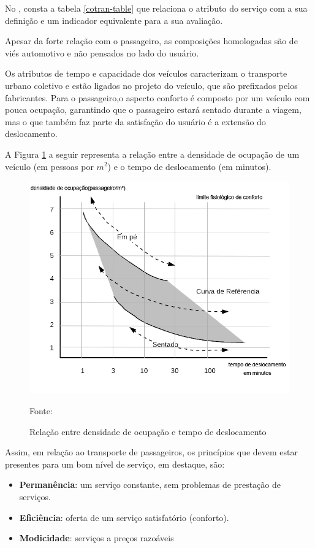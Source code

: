 No , consta a tabela \ref{cotran-table} que 
relaciona o atributo do serviço com a sua definição e um indicador equivalente para a sua avaliação.

Apesar da forte relação com o passageiro, as composições homologadas são de viés automotivo e não pensados no lado do usuário.
 
Os atributos de tempo e capacidade dos veículos caracterizam o transporte urbano coletivo e estão ligados no projeto do veículo, que são prefixados pelos fabricantes. Para o passageiro,o aspecto conforto é composto por um veículo com pouca ocupação, garantindo que o passageiro estará sentado durante a viagem, mas o que também faz parte da satisfação do usuário é a extensão do deslocamento.

A Figura \ref{figura-ocupacao-tempo} a seguir representa a relação entre a densidade de ocupação de um veículo (em pessoas por $m^2$) e o tempo de deslocamento (em minutos).

\begin{figure}[H]
  \centering
  \caption{Relação entre densidade de ocupação e tempo de deslocamento}
 \includegraphics[scale=0.55]{imagens/limite-fisiologico.png} \par
\bigskip
Fonte: \cite[p.307]{MARTINS}
\label{figura-ocupacao-tempo}
\end{figure}
Assim, em relação ao transporte de passageiros, os princípios que devem estar presentes para um bom nível de serviço, em destaque, são: 
\begin{itemize}
    \item \textbf{Permanência}: um serviço constante, sem problemas de prestação de serviços.
    \item \textbf{Eficiência}: oferta de um serviço satisfatório (conforto).
    \item \textbf{Modicidade}: serviços a preços razoáveis
\end{itemize}

